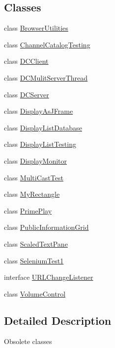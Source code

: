\subsection*{Classes}
\begin{DoxyCompactItemize}
\item 
class \hyperlink{classgov_1_1fnal_1_1ppd_1_1dd_1_1util_1_1attic_1_1BrowserUtilities}{Browser\-Utilities}
\item 
class \hyperlink{classgov_1_1fnal_1_1ppd_1_1dd_1_1util_1_1attic_1_1ChannelCatalogTesting}{Channel\-Catalog\-Testing}
\item 
class \hyperlink{classgov_1_1fnal_1_1ppd_1_1dd_1_1util_1_1attic_1_1DCClient}{D\-C\-Client}
\item 
class \hyperlink{classgov_1_1fnal_1_1ppd_1_1dd_1_1util_1_1attic_1_1DCMulitServerThread}{D\-C\-Mulit\-Server\-Thread}
\item 
class \hyperlink{classgov_1_1fnal_1_1ppd_1_1dd_1_1util_1_1attic_1_1DCServer}{D\-C\-Server}
\item 
class \hyperlink{classgov_1_1fnal_1_1ppd_1_1dd_1_1util_1_1attic_1_1DisplayAsJFrame}{Display\-As\-J\-Frame}
\item 
class \hyperlink{classgov_1_1fnal_1_1ppd_1_1dd_1_1util_1_1attic_1_1DisplayListDatabase}{Display\-List\-Database}
\item 
class \hyperlink{classgov_1_1fnal_1_1ppd_1_1dd_1_1util_1_1attic_1_1DisplayListTesting}{Display\-List\-Testing}
\item 
class \hyperlink{classgov_1_1fnal_1_1ppd_1_1dd_1_1util_1_1attic_1_1DisplayMonitor}{Display\-Monitor}
\item 
class \hyperlink{classgov_1_1fnal_1_1ppd_1_1dd_1_1util_1_1attic_1_1MultiCastTest}{Multi\-Cast\-Test}
\item 
class \hyperlink{classgov_1_1fnal_1_1ppd_1_1dd_1_1util_1_1attic_1_1MyRectangle}{My\-Rectangle}
\item 
class \hyperlink{classgov_1_1fnal_1_1ppd_1_1dd_1_1util_1_1attic_1_1PrimePlay}{Prime\-Play}
\item 
class \hyperlink{classgov_1_1fnal_1_1ppd_1_1dd_1_1util_1_1attic_1_1PublicInformationGrid}{Public\-Information\-Grid}
\item 
class \hyperlink{classgov_1_1fnal_1_1ppd_1_1dd_1_1util_1_1attic_1_1ScaledTextPane}{Scaled\-Text\-Pane}
\item 
class \hyperlink{classgov_1_1fnal_1_1ppd_1_1dd_1_1util_1_1attic_1_1SeleniumTest1}{Selenium\-Test1}
\item 
interface \hyperlink{interfacegov_1_1fnal_1_1ppd_1_1dd_1_1util_1_1attic_1_1URLChangeListener}{U\-R\-L\-Change\-Listener}
\item 
class \hyperlink{classgov_1_1fnal_1_1ppd_1_1dd_1_1util_1_1attic_1_1VolumeControl}{Volume\-Control}
\end{DoxyCompactItemize}


\subsection{Detailed Description}
Obsolete classes 